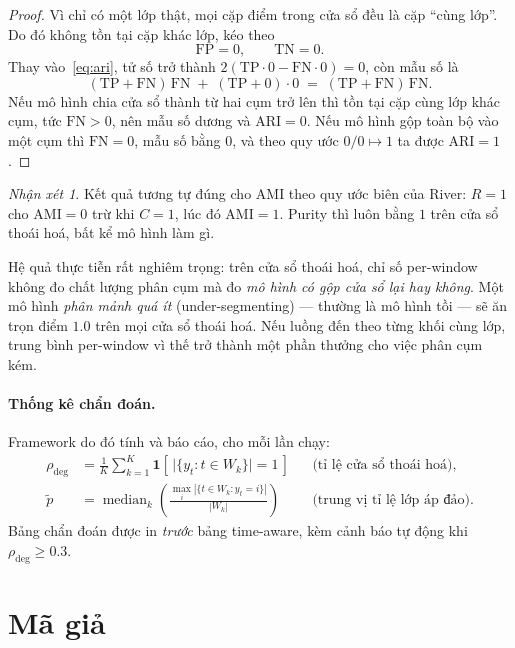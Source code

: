 \documentclass[11pt,a4paper]{article}
\theoremstyle{remark}
\newtheorem{remark}{Nhận xét}
\newcommand{\ind}[1]{\mathbf{1}\!\left[#1\right]}
\begin{document}
\begin{proof}
Vì chỉ có một lớp thật, mọi cặp điểm trong cửa sổ đều là cặp ``cùng lớp''. Do đó
không tồn tại cặp khác lớp, kéo theo
\[
  \mathrm{FP} = 0, \qquad \mathrm{TN} = 0 .
\]
Thay vào~\eqref{eq:ari}, tử số trở thành
$2(\mathrm{TP}\cdot 0 - \mathrm{FN}\cdot 0) = 0$, còn mẫu số là
\[
  (\mathrm{TP}+\mathrm{FN})\,\mathrm{FN} \;+\; (\mathrm{TP}+0)\cdot 0
  \;=\; (\mathrm{TP}+\mathrm{FN})\,\mathrm{FN}.
\]
Nếu mô hình chia cửa sổ thành từ hai cụm trở lên thì tồn tại cặp cùng lớp khác
cụm, tức $\mathrm{FN}>0$, nên mẫu số dương và $\mathrm{ARI}=0$. Nếu mô hình gộp
toàn bộ vào một cụm thì $\mathrm{FN}=0$, mẫu số bằng $0$, và theo quy ước
$0/0 \mapsto 1$ ta được $\mathrm{ARI}=1$.
\end{proof}

\begin{remark}
Kết quả tương tự đúng cho AMI theo quy ước biên của River: $R=1$ cho
$\mathrm{AMI}=0$ trừ khi $C=1$, lúc đó $\mathrm{AMI}=1$. Purity thì luôn bằng
$1$ trên cửa sổ thoái hoá, bất kể mô hình làm gì.
\end{remark}

Hệ quả thực tiễn rất nghiêm trọng: trên cửa sổ thoái hoá, chỉ số per-window
không đo chất lượng phân cụm mà đo \emph{mô hình có gộp cửa sổ lại hay không}.
Một mô hình \emph{phân mảnh quá ít} (under-segmenting) --- thường là mô hình
tồi --- sẽ ăn trọn điểm $1.0$ trên mọi cửa sổ thoái hoá. Nếu luồng đến theo từng
khối cùng lớp, trung bình per-window vì thế trở thành một phần thưởng cho việc
phân cụm kém.

\paragraph{Thống kê chẩn đoán.}
Framework do đó tính và báo cáo, cho mỗi lần chạy:
\begin{align}
  \rho_{\text{deg}} &= \frac{1}{K}\sum_{k=1}^{K}
    \ind{\,\big|\{y_t : t \in W_k\}\big| = 1\,}
    &&\text{(tỉ lệ cửa sổ thoái hoá)},\\
  \tilde{p} &= \operatorname{median}_{k}
    \left( \frac{\max_i |\{t\in W_k : y_t = i\}|}{|W_k|} \right)
    &&\text{(trung vị tỉ lệ lớp áp đảo)}.
\end{align}
Bảng chẩn đoán được in \emph{trước} bảng time-aware, kèm cảnh báo tự động khi
$\rho_{\text{deg}} \ge 0.3$.

\section{Mã giả}
\label{sec:pseudocode}
\end{document}
